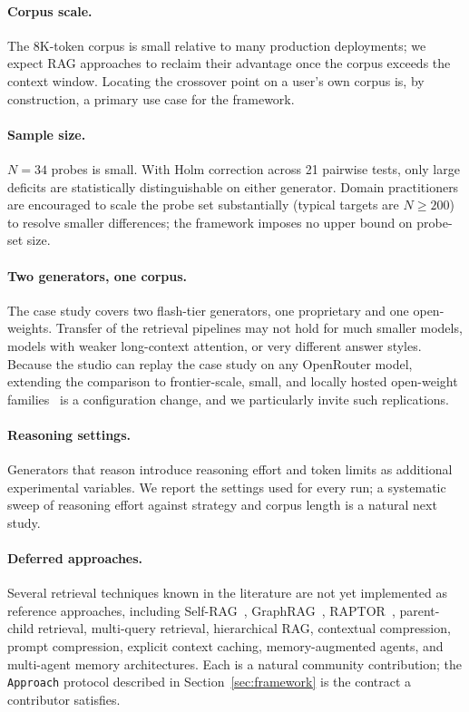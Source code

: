 \documentclass[conference,a4paper,10pt]{IEEEtran}
\begin{document}
\paragraph{Corpus scale.}
The 8K-token corpus is small relative to many production deployments; we expect RAG approaches to reclaim their advantage once the corpus exceeds the context window.
Locating the crossover point on a user's own corpus is, by construction, a primary use case for the framework.

\paragraph{Sample size.}
$N = 34$ probes is small.
With Holm correction across 21 pairwise tests, only large deficits are statistically distinguishable on either generator.
Domain practitioners are encouraged to scale the probe set substantially (typical targets are $N \geq 200$) to resolve smaller differences; the framework imposes no upper bound on probe-set size.

\paragraph{Two generators, one corpus.}
The case study covers two flash-tier generators, one proprietary and one open-weights.
Transfer of the retrieval pipelines may not hold for much smaller models, models with weaker long-context attention, or very different answer styles.
Because the studio can replay the case study on any OpenRouter model, extending the comparison to frontier-scale, small, and locally hosted open-weight families~\cite{touvron2023llama} is a configuration change, and we particularly invite such replications.

\paragraph{Reasoning settings.}
Generators that reason introduce reasoning effort and token limits as additional experimental variables.
We report the settings used for every run; a systematic sweep of reasoning effort against strategy and corpus length is a natural next study.

\paragraph{Deferred approaches.}
Several retrieval techniques known in the literature are not yet implemented as reference approaches, including Self-RAG~\cite{asai2024selfrag}, GraphRAG~\cite{edge2024graphrag}, RAPTOR~\cite{sarthi2024raptor}, parent-child retrieval, multi-query retrieval, hierarchical RAG, contextual compression, prompt compression, explicit context caching, memory-augmented agents, and multi-agent memory architectures.
Each is a natural community contribution; the \texttt{Approach} protocol described in Section~\ref{sec:framework} is the contract a contributor satisfies.
\end{document}
